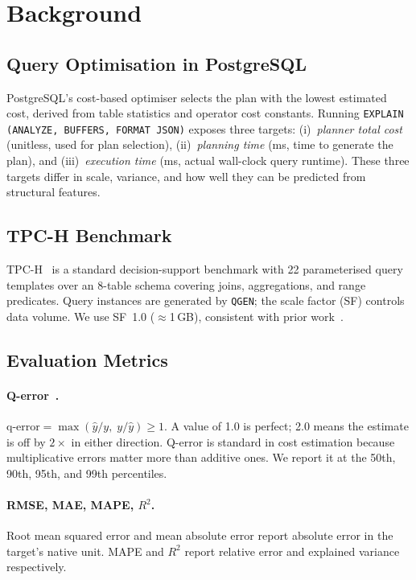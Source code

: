 \documentclass[runningheads]{llncs}
\begin{document}
\section{Background}
\label{sec:background}

\subsection{Query Optimisation in PostgreSQL}

PostgreSQL's cost-based optimiser selects the plan with the lowest
estimated cost, derived from table statistics and operator cost constants.
Running \texttt{EXPLAIN (ANALYZE, BUFFERS, FORMAT JSON)} exposes three
targets: (i)~\emph{planner total cost} (unitless, used for plan
selection), (ii)~\emph{planning time} (ms, time to generate the plan),
and (iii)~\emph{execution time} (ms, actual wall-clock query runtime).
These three targets differ in scale, variance, and how well they can be
predicted from structural features.

\subsection{TPC-H Benchmark}

TPC-H~\cite{tpch} is a standard decision-support benchmark with 22
parameterised query templates over an 8-table schema covering joins,
aggregations, and range predicates.
Query instances are generated by \texttt{QGEN}; the scale factor (SF)
controls data volume.
We use SF~1.0 (${\approx}$1\,GB), consistent with prior
work~\cite{marcus2019,liang2023}.

\subsection{Evaluation Metrics}

\paragraph{Q-error~\cite{leis2015}.}
$\text{q-error} = \max(\hat{y}/y,\; y/\hat{y}) \geq 1$.
A value of 1.0 is perfect; 2.0 means the estimate is off by $2\times$ in
either direction.
Q-error is standard in cost estimation because multiplicative errors
matter more than additive ones.
We report it at the 50th, 90th, 95th, and 99th percentiles.

\paragraph{RMSE, MAE, MAPE, $R^2$.}
Root mean squared error and mean absolute error report absolute error in
the target's native unit.
MAPE and $R^2$ report relative error and explained variance respectively.
\end{document}
